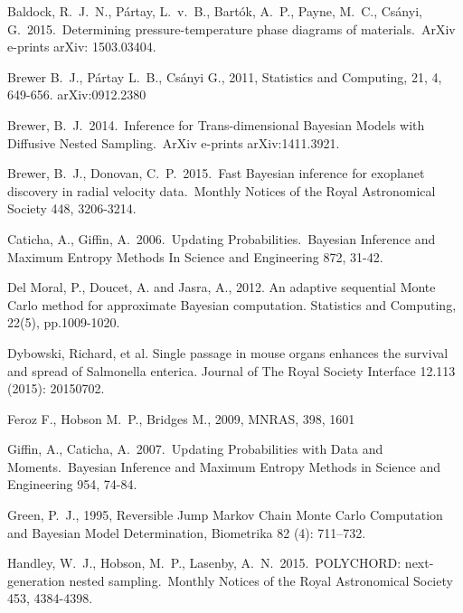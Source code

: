 \documentclass[article]{jss}
\begin{document}
\begin{thebibliography}{99}
 Baldock, R.~J.~N., 
P{\'a}rtay, L.~v.~B., Bart{\'o}k, A.~P., Payne, M.~C., Cs{\'a}nyi, G.\ 
2015.\ Determining pressure-temperature phase diagrams of materials.\ ArXiv 
e-prints arXiv: 1503.03404. 

 Brewer B.~J., P{\'a}rtay L.~B., Cs{\'a}nyi G., 2011,
Statistics and Computing, 21, 4, 649-656. arXiv:0912.2380

 Brewer, B.~J.\ 2014.\ Inference for Trans-dimensional Bayesian Models with Diffusive Nested Sampling.\ ArXiv e-prints arXiv:1411.3921.

 Brewer, B.~J., Donovan, C.~P.\ 2015.\ Fast Bayesian inference for exoplanet discovery in radial velocity data.\ Monthly Notices of the Royal Astronomical Society 448, 3206-3214. 

 Caticha, A., Giffin, A.\ 2006.\ Updating Probabilities.\ Bayesian Inference and Maximum Entropy Methods In Science and Engineering 872, 31-42. 

Del Moral, P., Doucet, A. and Jasra, A., 2012. An adaptive sequential Monte Carlo method for approximate Bayesian computation. Statistics and Computing, 22(5), pp.1009-1020.

Dybowski, Richard, et al. Single passage in mouse organs enhances the survival and spread of Salmonella enterica. Journal of The Royal Society Interface 12.113 (2015): 20150702.

 Feroz F., Hobson M.~P., Bridges M., 2009, MNRAS, 398, 1601

 Giffin, A., Caticha, A.\ 2007.\ Updating Probabilities with Data and Moments.\ Bayesian Inference and Maximum Entropy Methods in Science and Engineering 954, 74-84. 

Green, P.~J., 1995, Reversible Jump Markov Chain Monte Carlo Computation and Bayesian Model Determination, Biometrika 82 (4): 711–732.

 Handley, W.~J., Hobson, M.~P., Lasenby, A.~N.\ 2015.\ POLYCHORD: next-generation nested sampling.\ Monthly Notices of the Royal Astronomical Society 453, 4384-4398. 


\end{thebibliography}
\end{document}
